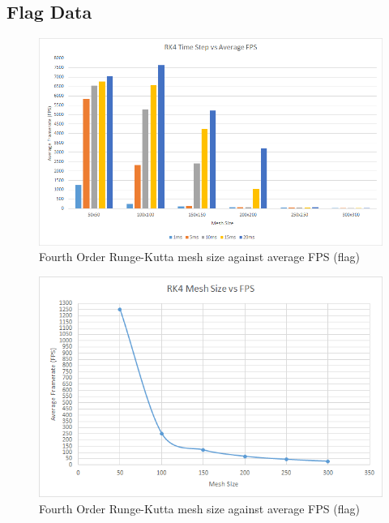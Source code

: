 \begin{landscape}
\subsection{Flag Data}

    \begin{figure}[!htb]
    \begin{center}
      \includegraphics[scale=0.95]{Figures/flag_rk4_fps}
    \end{center}
    \caption{Fourth Order Runge-Kutta mesh size against average FPS (flag)}
    \label{fig:rk4 fps flag}
  \end{figure}
\end{landscape}
  
    \begin{figure}
    \begin{center}
      \includegraphics[scale=.9]{Figures/flag_rk4_m_fps}
    \end{center}
    \caption{Fourth Order Runge-Kutta mesh size against average FPS (flag)}
    \label{fig:rk4 mesh fps flag}
  \end{figure}
  
